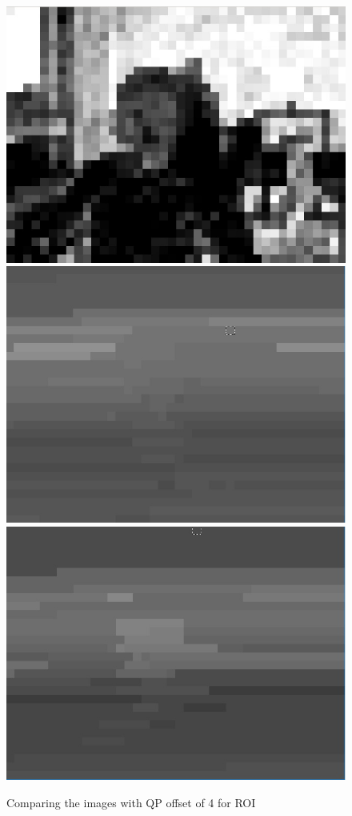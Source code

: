 \documentclass[11pt]{article} %
\begin{document}
\begin{figure}[!h]
    \includegraphics[scale=0.4]{QPOffset/paul120_250kbps_QPoffset4_psnr}
    \includegraphics[scale=0.37]{PaulDefault120_91250kbps_quant}
    \includegraphics[scale=0.4]{QPOffset/paul120_250kbps_QPoffset4_quant}    
    \caption{Comparing the images with QP offset of 4 for ROI}
    \label{fig:Default_QPOffsetCompareold}
\end{figure}
\fi
\end{document}
